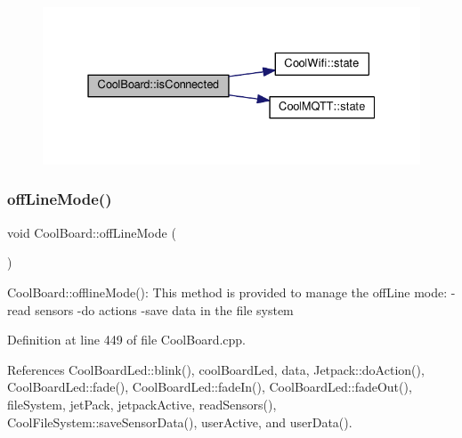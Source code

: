 \begin{figure}[H]
\begin{center}
\leavevmode
\includegraphics[width=331pt]{classCoolBoard_ad7442cf4b62c7b0d5bd62a0f75ffc065_cgraph}
\end{center}
\end{figure}
\mbox{\label{classCoolBoard_ae6b5e1274d760462290192acea4adca8}} 
\subsubsection{\texorpdfstring{off\+Line\+Mode()}{offLineMode()}}
{\footnotesize\ttfamily void Cool\+Board\+::off\+Line\+Mode (\begin{DoxyParamCaption}{ }\end{DoxyParamCaption})}

Cool\+Board\+::offline\+Mode()\+: This method is provided to manage the off\+Line mode\+: -\/read sensors -\/do actions -\/save data in the file system 

Definition at line 449 of file Cool\+Board.\+cpp.



References Cool\+Board\+Led\+::blink(), cool\+Board\+Led, data, Jetpack\+::do\+Action(), Cool\+Board\+Led\+::fade(), Cool\+Board\+Led\+::fade\+In(), Cool\+Board\+Led\+::fade\+Out(), file\+System, jet\+Pack, jetpack\+Active, read\+Sensors(), Cool\+File\+System\+::save\+Sensor\+Data(), user\+Active, and user\+Data().


